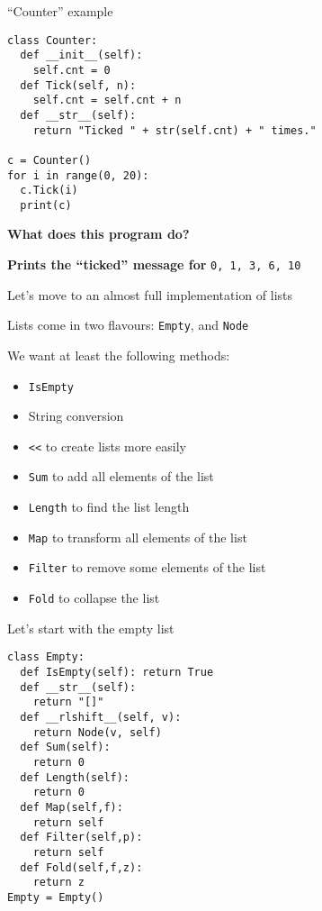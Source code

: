 \documentclass{beamer}
\begin{document}
\begin{frame}[fragile]{``Counter'' example}
\begin{lstlisting}
class Counter:
  def __init__(self):
    self.cnt = 0
  def Tick(self, n):
    self.cnt = self.cnt + n
  def __str__(self):
    return "Ticked " + str(self.cnt) + " times."

c = Counter()
for i in range(0, 20):
  c.Tick(i)
  print(c)
\end{lstlisting}

\textbf{What does this program do?}

\pause

\textbf{Prints the ``ticked'' message for} \texttt{0, 1, 3, 6, 10}
\end{frame}


\begin{slide}{
\item Let's move to an almost full implementation of lists
\item Lists come in two flavours: \texttt{Empty}, and \texttt{Node}
\item We want at least the following methods:
\begin{itemize}
\item \texttt{IsEmpty}
\item String conversion
\item \texttt{<<} to create lists more easily
\item \texttt{Sum} to add all elements of the list
\item \texttt{Length} to find the list length
\item \texttt{Map} to transform all elements of the list
\item \texttt{Filter} to remove some elements of the list
\item \texttt{Fold} to collapse the list
\end{itemize}
}\end{slide}

\begin{frame}[fragile]{Let's start with the empty list}
\begin{lstlisting}
class Empty:
  def IsEmpty(self): return True
  def __str__(self):
    return "[]"
  def __rlshift__(self, v):
    return Node(v, self)
  def Sum(self):
    return 0
  def Length(self):
    return 0
  def Map(self,f):
    return self
  def Filter(self,p):
    return self
  def Fold(self,f,z):
    return z
Empty = Empty()
\end{lstlisting}
\end{frame}
\end{document}
